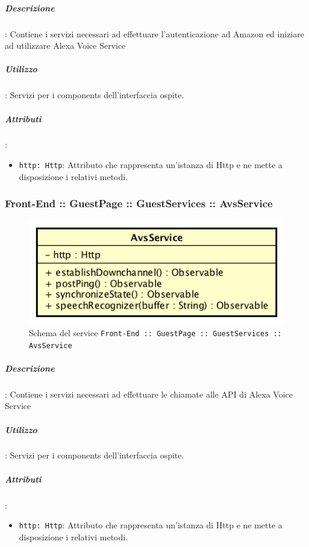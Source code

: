 \documentclass[../ManualeSviluppatore_v2.0.0.tex]{subfiles}
\begin{document}
			\subparagraph{Descrizione}: Contiene i servizi necessari ad effettuare l'autenticazione ad Amazon ed iniziare ad utilizzare Alexa Voice Service
			\subparagraph{Utilizzo}: Servizi per i components dell'interfaccia ospite.
			\subparagraph{Attributi}:
			\begin{itemize}
				\item \texttt{http: Http}: Attributo che rappresenta un'istanza di Http e ne mette a disposizione i relativi metodi.
			\end{itemize}

\newpage
			\subsubsection{Front-End :: GuestPage :: GuestServices :: AvsService}
			\begin{figure}[!h]
				\centering
				\includegraphics[scale=0.6]{Architettura/Front-End/GuestPage/GuestServices/AvsService.png}
				\caption{Schema del service \texttt{Front-End :: GuestPage :: GuestServices :: AvsService}}
			\end{figure}

				\subparagraph{Descrizione}: Contiene i servizi necessari ad effettuare le chiamate alle API di Alexa Voice Service
				\subparagraph{Utilizzo}: Servizi per i components dell'interfaccia ospite.
				\subparagraph{Attributi}:
				\begin{itemize}
					\item \texttt{http: Http}: Attributo che rappresenta un'istanza di Http e ne mette a disposizione i relativi metodi.
				\end{itemize}
\end{document}
